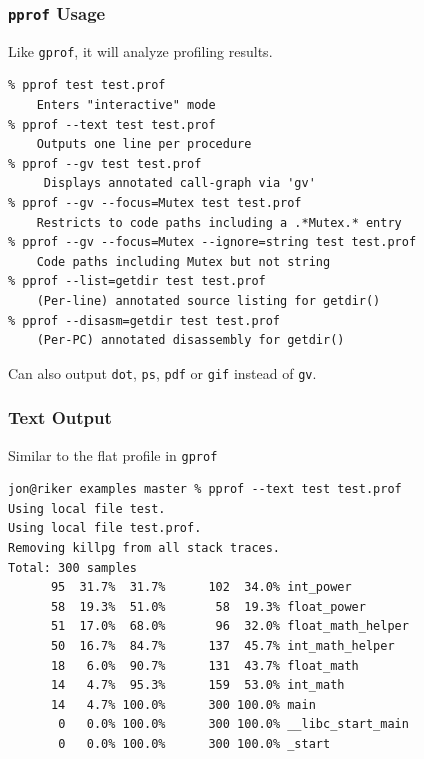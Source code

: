 \begin{frame}[fragile]
  \frametitle{{\tt pprof} Usage}


\large
\begin{changemargin}{1.5cm}
    Like {\tt gprof}, it will analyze profiling results.

  \begin{lstlisting}
% pprof test test.prof
    Enters "interactive" mode
% pprof --text test test.prof
    Outputs one line per procedure
% pprof --gv test test.prof
     Displays annotated call-graph via 'gv'
% pprof --gv --focus=Mutex test test.prof
    Restricts to code paths including a .*Mutex.* entry
% pprof --gv --focus=Mutex --ignore=string test test.prof
    Code paths including Mutex but not string
% pprof --list=getdir test test.prof
    (Per-line) annotated source listing for getdir()
% pprof --disasm=getdir test test.prof
    (Per-PC) annotated disassembly for getdir()
  \end{lstlisting}

    Can also output {\tt dot}, {\tt ps}, {\tt pdf} or {\tt gif} instead of
      {\tt gv}.
      \end{changemargin}

\end{frame}

\begin{frame}[fragile]
  \frametitle{Text Output}

\large
\begin{changemargin}{1.5cm}

    Similar to the flat profile in {\tt gprof}

  \begin{lstlisting}
jon@riker examples master % pprof --text test test.prof 
Using local file test.
Using local file test.prof.
Removing killpg from all stack traces.
Total: 300 samples
      95  31.7%  31.7%      102  34.0% int_power
      58  19.3%  51.0%       58  19.3% float_power
      51  17.0%  68.0%       96  32.0% float_math_helper
      50  16.7%  84.7%      137  45.7% int_math_helper
      18   6.0%  90.7%      131  43.7% float_math
      14   4.7%  95.3%      159  53.0% int_math
      14   4.7% 100.0%      300 100.0% main
       0   0.0% 100.0%      300 100.0% __libc_start_main
       0   0.0% 100.0%      300 100.0% _start
  \end{lstlisting}
  
  \end{changemargin}
\end{frame}

